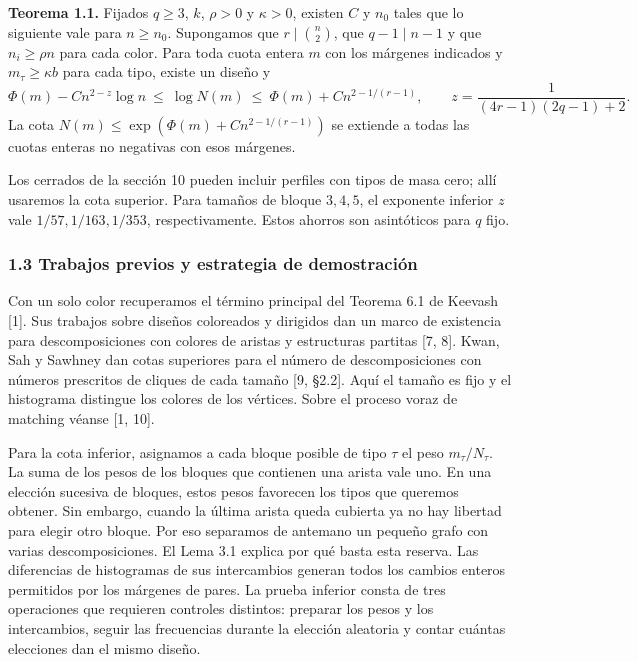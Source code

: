 \documentclass[spanish,11pt,a4paper]{article}
\begin{document}
\textbf{Teorema 1.1.} Fijados \(q\ge3\), \(k\), \(\rho>0\) y \(\kappa>0\), existen \(C\) y \(n_0\) tales que lo siguiente vale para \(n\ge n_0\). Supongamos que \(r\mid\binom n2\), que \(q-1\mid n-1\) y que \(n_i\ge\rho n\) para cada color. Para toda cuota entera \(m\) con los márgenes indicados y \(m_\tau\ge\kappa b\) para cada tipo, existe un diseño y \[\Phi(m)-C n^{2-z}\log n\ \le\ \log N(m)\
 \le\ \Phi(m)+C n^{2-1/(r-1)},\qquad
 z=\frac{1}{(4r-1)(2q-1)+2}. \tag{2}\] La cota \(N(m)\le\exp(\Phi(m)+C n^{2-1/(r-1)})\) se extiende a todas las cuotas enteras no negativas con esos márgenes.

Los cerrados de la sección 10 pueden incluir perfiles con tipos de masa cero; allí usaremos la cota superior. Para tamaños de bloque \(3,4,5\), el exponente inferior \(z\) vale \(1/57,1/163,1/353\), respectivamente. Estos ahorros son asintóticos para \(q\) fijo.

\subsubsection{1.3 Trabajos previos y estrategia de demostración}\label{trabajos-previos-y-estrategia-de-demostraciuxf3n}

Con un solo color recuperamos el término principal del Teorema 6.1 de Keevash {[}1{]}. Sus trabajos sobre diseños coloreados y dirigidos dan un marco de existencia para descomposiciones con colores de aristas y estructuras partitas {[}7, 8{]}. Kwan, Sah y Sawhney dan cotas superiores para el número de descomposiciones con números prescritos de cliques de cada tamaño {[}9, §2.2{]}. Aquí el tamaño es fijo y el histograma distingue los colores de los vértices. Sobre el proceso voraz de matching véanse {[}1, 10{]}.

Para la cota inferior, asignamos a cada bloque posible de tipo \(\tau\) el peso \(m_\tau/N_\tau\). La suma de los pesos de los bloques que contienen una arista vale uno. En una elección sucesiva de bloques, estos pesos favorecen los tipos que queremos obtener. Sin embargo, cuando la última arista queda cubierta ya no hay libertad para elegir otro bloque. Por eso separamos de antemano un pequeño grafo con varias descomposiciones. El Lema 3.1 explica por qué basta esta reserva. Las diferencias de histogramas de sus intercambios generan todos los cambios enteros permitidos por los márgenes de pares. La prueba inferior consta de tres operaciones que requieren controles distintos: preparar los pesos y los intercambios, seguir las frecuencias durante la elección aleatoria y contar cuántas elecciones dan el mismo diseño.
\end{document}
